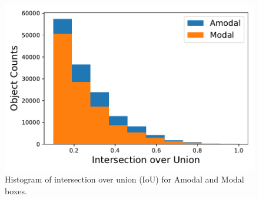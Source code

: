
\begin{figure}[t]
\centering
\setlength{\tabcolsep}{0pt}
\includegraphics[width=0.48\linewidth]{fig/sailvos_iou_hist}
\vspace{-0.4cm}
\caption{Histogram of intersection over union (IoU) for Amodal and Modal boxes.}
\label{fig:sailvos_iou_hist}

\end{figure}